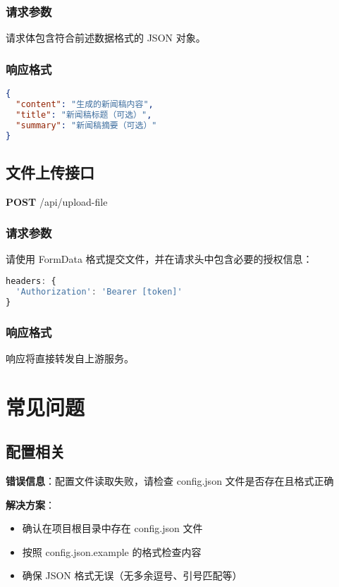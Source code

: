 \documentclass[a4paper, 12pt]{article}
\begin{document}
\subsubsection{请求参数}
请求体包含符合前述数据格式的 JSON 对象。

\subsubsection{响应格式}
\begin{lstlisting}[language=json]
{
  "content": "生成的新闻稿内容",
  "title": "新闻稿标题（可选）",
  "summary": "新闻稿摘要（可选）"
}
\end{lstlisting}

\subsection{文件上传接口}
\begin{tcolorbox}[colback=gray!5,colframe=gray!50,title=API 路径]
\textbf{POST} /api/upload-file
\end{tcolorbox}

\subsubsection{请求参数}
请使用 FormData 格式提交文件，并在请求头中包含必要的授权信息：
\begin{lstlisting}[language=javascript]
headers: {
  'Authorization': 'Bearer [token]'
}
\end{lstlisting}

\subsubsection{响应格式}
响应将直接转发自上游服务。

\section{常见问题}

\subsection{配置相关}
\begin{tcolorbox}[colback=red!5,colframe=red!40,title=问题：配置文件缺失]
\textbf{错误信息}：配置文件读取失败，请检查 config.json 文件是否存在且格式正确

\textbf{解决方案}：
\begin{itemize}
    \item 确认在项目根目录中存在 config.json 文件
    \item 按照 config.json.example 的格式检查内容
    \item 确保 JSON 格式无误（无多余逗号、引号匹配等）
\end{itemize}
\end{tcolorbox}
\end{document}
